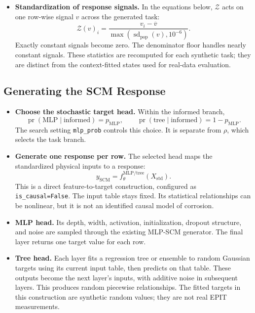 \documentclass[11pt]{article}
\newcommand{\pr}{\operatorname{pr}}
\newenvironment{notes}
  {\begin{itemize}\setlength{\itemsep}{0.45em}\setlength{\parsep}{0pt}}
  {\end{itemize}}
\begin{document}
\begin{notes}
    \item \textbf{Standardization of response signals.}
    In the equations below, \(\mathcal{Z}\) acts on one
    row-wise signal \(v\) across the generated task:
    \[
        \mathcal{Z}(v)_i
        =
        \frac{v_i-\overline v}
             {\max(\operatorname{sd}_{\mathrm{pop}}(v),10^{-6})}.
    \]
    Exactly constant signals become zero. The denominator floor
    handles nearly constant signals. These statistics are
    recomputed for each synthetic task; they are distinct
    from the context-fitted states used for real-data evaluation.
\end{notes}

\subsection{Generating the SCM Response}
\label{sec:informed-scm-target}

\begin{notes}
    \item \textbf{Choose the stochastic target head.}
    Within the informed branch,
    \[
        \pr(\mathrm{MLP}\mid\mathrm{informed})=p_{\mathrm{MLP}},
        \qquad
        \pr(\mathrm{tree}\mid\mathrm{informed})=1-p_{\mathrm{MLP}}.
    \]
    The search setting \texttt{mlp\_prob} controls this choice.
    It is separate from \(\rho\), which selects the task branch.

    \item \textbf{Generate one response per row.}
    The selected head maps the standardized physical inputs to
    a response:
    \begin{equation}
        y_{\mathrm{SCM}}
        =
        f_\theta^{\mathrm{MLP/tree}}(X_{\mathrm{std}}).
        \label{eq:scm-target}
    \end{equation}
    This is a direct feature-to-target construction, configured
    as \texttt{is\_causal=False}. The input table stays fixed.
    Its statistical relationships can be nonlinear, but it is
    not an identified causal model of corrosion.

    \item \textbf{MLP head.} Its depth, width, activation,
    initialization, dropout structure, and noise are sampled
    through the existing MLP-SCM generator. The final layer
    returns one target value for each row.

    \item \textbf{Tree head.} Each layer fits a regression tree
    or ensemble to random Gaussian targets using its current
    input table, then predicts on that table. These outputs
    become the next layer's inputs, with additive noise in
    subsequent layers. This produces random piecewise
    relationships. The fitted targets in this construction are
    synthetic random values; they are not real EPIT measurements.
\end{notes}
\end{document}
